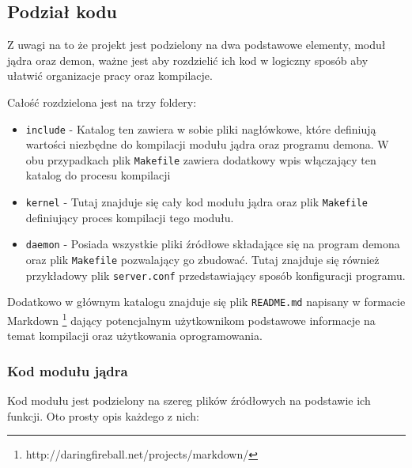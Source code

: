 \documentclass[10pt]{article}
\begin{document}
\subsection{Podział kodu}

Z uwagi na to że projekt jest podzielony na dwa podstawowe elementy,
moduł jądra oraz demon, ważne jest aby rozdzielić ich kod w logiczny
sposób aby ułatwić organizacje pracy oraz kompilacje.

Całość rozdzielona jest na trzy foldery:

\begin{itemize}
\itemsep1pt\parskip0pt
\item
  \texttt{include} - Katalog ten zawiera w sobie pliki nagłówkowe, które
  definiują wartości niezbędne do kompilacji modułu jądra oraz programu
  demona. W obu przypadkach plik \texttt{Makefile} zawiera dodatkowy
  wpis włączający ten katalog do procesu kompilacji
\item
  \texttt{kernel} - Tutaj znajduje się cały kod modułu jądra oraz plik
  \texttt{Makefile} definiujący proces kompilacji tego modułu.
\item
  \texttt{daemon} - Posiada wszystkie pliki źródłowe składające się na
  program demona oraz plik \texttt{Makefile} pozwalający go zbudować.
  Tutaj znajduje się również przykładowy plik \texttt{server.conf}
  przedstawiający sposób konfiguracji programu.
\end{itemize}

Dodatkowo w głównym katalogu znajduje się plik \texttt{README.md}
napisany w formacie Markdown \footnote{http://daringfireball.net/projects/markdown/} dający
potencjalnym użytkownikom podstawowe informacje na temat kompilacji oraz
użytkowania oprogramowania.

\subsubsection{Kod modułu jądra}

Kod modułu jest podzielony na szereg plików źródłowych na podstawie ich
funkcji. Oto prosty opis każdego z nich:
\end{document}
